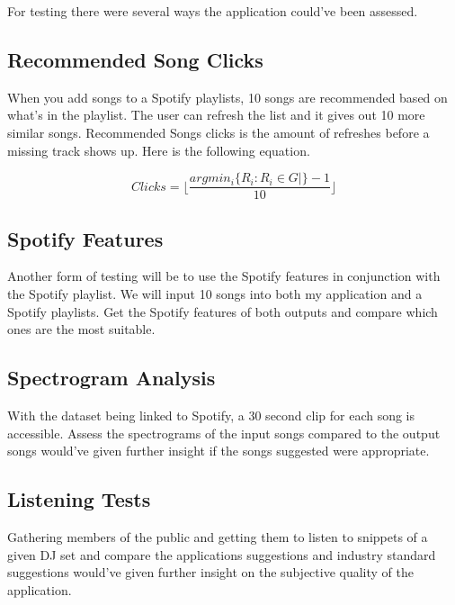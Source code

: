 For testing there were several ways the application could've been assessed. 

\subsection{Recommended Song Clicks}
When you add songs to a Spotify playlists, 10 songs are recommended based on what's in the playlist. The user can refresh the list and it gives out 10 more similar songs. Recommended Songs clicks is the amount of refreshes before a missing track shows up. Here is the following equation.

\begin{equation}
	Clicks= \lfloor \frac {argmin_{i}  \{ R_{i} : R_{i} \in G | \} -1} { 10 } \rfloor
\end{equation}


\subsection{Spotify Features}
Another form of testing will be to use the Spotify features in conjunction with the Spotify playlist. We will input 10 songs into both my application and a Spotify playlists. Get the Spotify features of both outputs and compare which ones are the most suitable.

\subsection{Spectrogram Analysis}
With the dataset being linked to Spotify, a 30 second clip for each song is accessible. Assess the spectrograms of the input songs compared to the output songs would've given further insight if the songs suggested were appropriate.
 
\subsection{Listening Tests}
Gathering members of the public and getting them to listen to snippets of a given DJ set and compare the applications suggestions and industry standard suggestions would've given further insight on the subjective quality of the application.



